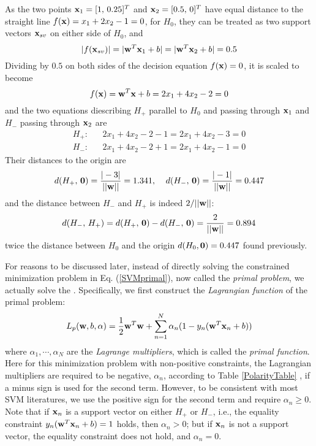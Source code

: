 \documentclass{article}
\begin{document}
As the two points ${\bf x}_1=[1,\,0.25]^T$ and ${\bf x}_2=[0.5,\,0]^T$
have equal distance to the straight line $f({\bf x})=x_1+2x_2-1=0$, 
for $H_0$, they can be treated as two support vectors ${\bf x}_{sv}$ 
on either side of $H_0$, and 
\begin{equation}
  |f({\bf x}_{sv})|=|{\bf w}^T{\bf x}_1+b|=|{\bf w}^T{\bf x}_2+b|=0.5
\end{equation}
Dividing by $0.5$ on both sides of the decision equation $f({\bf x})=0$,
it is scaled to become
\begin{equation}
  f({\bf x})={\bf w}^T{\bf x}+b=2x_1+4x_2-2=0
\end{equation}
and the two equations diescribing $H_+$ parallel to $H_0$ and passing
through ${\bf x}_1$ and $H_-$ passing through ${\bf x}_2$ are
\begin{eqnarray}
  H_+: && 2x_1+4x_2-2-1=2x_1+4x_2-3=0\nonumber\\
  H_-: && 2x_1+4x_2-2+1=2x_1+4x_2-1=0\nonumber
  \nonumber
\end{eqnarray}
Their distances to the origin are
\begin{equation}
  d(H_+,\,{\bf 0})=\frac{|-3|}{||{\bf w}||}=1.341,\;\;\;\;
  d(H_-,\,{\bf 0})=\frac{|-1|}{||{\bf w}||}=0.447
\end{equation}
and the distance between $H_-$ and $H_+$ is indeed $2/||{\bf w}||$:
\begin{equation}
  d(H_-,\,H_+)=d(H_+,\,{\bf 0})-d(H_-,\,{\bf 0})=\frac{2}{||{\bf w}||}
  =0.894
\end{equation}
twice the distance between $H_0$ and the origin $d(H_0,{\bf 0})=0.447$
found previously.


For reasons to be discussed later, instead of directly solving the 
constrained minimization problem in Eq. (\ref{SVMprimal}), now called 
the {\em primal problem}, we actually solve the
.
Specifically, we first construct the {\em Lagrangian function} of the
primal problem:
\begin{equation}
  L_p({\bf w},b,{\bf \alpha})=\frac{1}{2}{\bf w}^T{\bf w}
  +\sum_{n=1}^N \alpha_n(1-y_n( {\bf w}^T {\bf x}_n+b))
  \label{SVMLagrange}
\end{equation}
where $\alpha_1,\cdots,\alpha_N$ are the {\em Lagrange multipliers},
which is called the {\em primal function}. Here for this minimization 
problem with non-positive constraints, the Lagrangian multipliers are
required to be negative, $\alpha_n$, according to Table \ref{PolarityTable} 
, if a minus sign is used 
for the second term. However, to be consistent with most SVM literatures,
we use the positive sign for the second term and require $\alpha_n\ge 0$.
Note that if ${\bf x}_n$ is a support vector on either $H_+$ or $H_-$, 
i.e., the equality constraint $y_n({\bf w}^T{\bf x}_n+b)=1$ holds, then 
$\alpha_n>0$; but if ${\bf x}_n$ is not a support vector, the equality
constraint does not hold, and $\alpha_n=0$.
\end{document}
